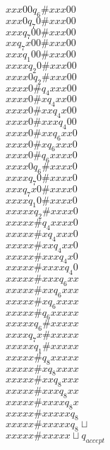 \documentclass[11pt]{article}
\begin{document}
$x x x 0 0 q_6 \# x x x 0 0$\\
$x x x 0 q_7 0 \# x x x 0 0$\\
$x x x q_7 0 0 \# x x x 0 0$\\
$x x q_7 x 0 0 \# x x x 0 0$\\
$x x x q_1 0 0 \# x x x 0 0$\\
$x x x x q_2 0 \# x x x 0 0$\\
$x x x x 0 q_2 \# x x x 0 0$\\
$x x x x 0 \# q_4 x x x 0 0$\\
$x x x x 0 \# x q_4 x x 0 0$\\
$x x x x 0 \# x x q_4 x 0 0$\\
$x x x x 0 \# x x x q_4 0 0$\\
$x x x x 0 \# x x q_6 x x 0$\\
$x x x x 0 \# x q_6 x x x 0$\\
$x x x x 0 \# q_6 x x x x 0$\\
$x x x x 0 q_6 \# x x x x 0$\\
$x x x x q_7 0 \# x x x x 0$\\
$x x x q_7 x 0 \# x x x x 0$\\
$x x x x q_1 0 \# x x x x 0$\\
$x x x x x q_2 \# x x x x 0$\\
$x x x x x \# q_4 x x x x 0$\\
$x x x x x \# x q_4 x x x 0$\\
$x x x x x \# x x q_4 x x 0$\\
$x x x x x \# x x x q_4 x 0$\\
$x x x x x \# x x x x q_4 0$\\
$x x x x x \# x x x q_6 x x$\\
$x x x x x \# x x q_6 x x x$\\
$x x x x x \# x q_6 x x x x$\\
$x x x x x \# q_6 x x x x x$\\
$x x x x x q_6 \# x x x x x$\\
$x x x x q_7 x \# x x x x x$\\
$x x x x x q_1 \# x x x x x$\\
$x x x x x \# q_8 x x x x x$\\
$x x x x x \# x q_8 x x x x$\\
$x x x x x \# x x q_8 x x x$\\
$x x x x x \# x x x q_8 x x$\\
$x x x x x \# x x x x q_8 x$\\
$x x x x x \# x x x x x q_8$\\
$x x x x x \# x x x x x q_8 \sqcup$\\
$x x x x x \# x x x x x \sqcup q_{accept}$\\
\end{document}
